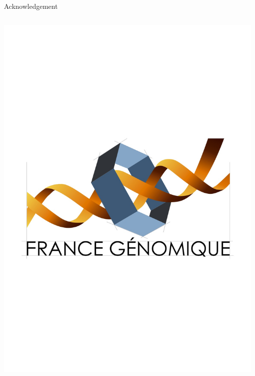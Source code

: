 \documentclass{beamer}
\begin{document}
\begin{frame}{Acknowledgement}
\begin{columns}[t]
\begin{column}{0.5\textwidth}
\begin{itemize}
                    \includegraphics[scale=0.13,trim=0 8cm 0 9cm,clip]{images/france_genomique}
            \end{itemize}
        \end{column}
    \end{columns}
\end{frame}
\end{document}
